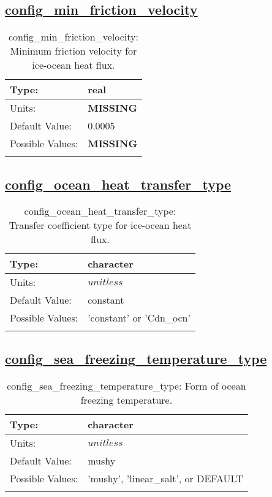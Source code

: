 \subsection[config\_min\_friction\_velocity]{\hyperref[sec:nm_tab_ocean]{config\_min\_friction\_velocity}}
\label{subsec:nm_sec_config_min_friction_velocity}
\begin{center}
\begin{longtable}{| p{2.0in} || p{4.0in} |}
    \hline
    Type: & real \\
    \hline
    Units: & {\bf \color{red} MISSING} \\
    \hline
    Default Value: & 0.0005 \\
    \hline
    Possible Values: & {\bf \color{red} MISSING} \\
    \hline
    \caption{config\_min\_friction\_velocity: Minimum friction velocity for ice-ocean heat flux.}
\end{longtable}
\end{center}
\subsection[config\_ocean\_heat\_transfer\_type]{\hyperref[sec:nm_tab_ocean]{config\_ocean\_heat\_transfer\_type}}
\label{subsec:nm_sec_config_ocean_heat_transfer_type}
\begin{center}
\begin{longtable}{| p{2.0in} || p{4.0in} |}
    \hline
    Type: & character \\
    \hline
    Units: & $unitless$ \\
    \hline
    Default Value: & constant \\
    \hline
    Possible Values: & 'constant' or 'Cdn\_ocn' \\
    \hline
    \caption{config\_ocean\_heat\_transfer\_type: Transfer coefficient type for ice-ocean heat flux.}
\end{longtable}
\end{center}
\subsection[config\_sea\_freezing\_temperature\_type]{\hyperref[sec:nm_tab_ocean]{config\_sea\_freezing\_temperature\_type}}
\label{subsec:nm_sec_config_sea_freezing_temperature_type}
\begin{center}
\begin{longtable}{| p{2.0in} || p{4.0in} |}
    \hline
    Type: & character \\
    \hline
    Units: & $unitless$ \\
    \hline
    Default Value: & mushy \\
    \hline
    Possible Values: & 'mushy', 'linear\_salt', or DEFAULT \\
    \hline
    \caption{config\_sea\_freezing\_temperature\_type: Form of ocean freezing temperature.}
\end{longtable}
\end{center}
